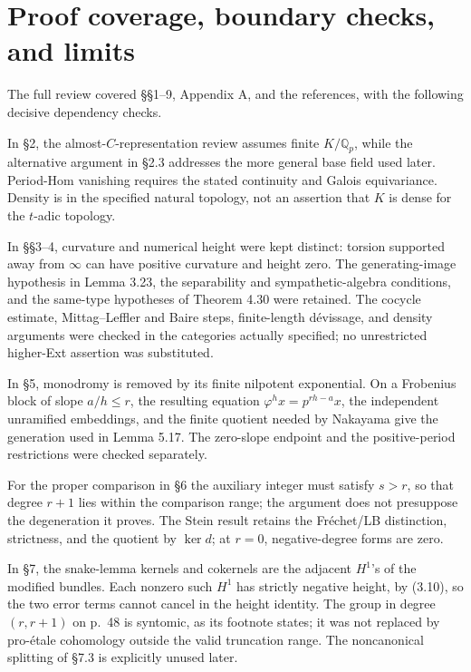 \documentclass[10pt]{article}
\begin{document}
\section*{Proof coverage, boundary checks, and limits}
The full review covered §§1–9, Appendix A, and the references, with the following decisive dependency checks.\par
In §2, the almost-\(C\)-representation review assumes finite \(K/\mathbb Q_p\), while the alternative argument in §2.3 addresses the more general base field used later. Period-Hom vanishing requires the stated continuity and Galois equivariance. Density is in the specified natural topology, not an assertion that \(K\) is dense for the \(t\)-adic topology.\par
In §§3–4, curvature and numerical height were kept distinct: torsion supported away from \(\infty\) can have positive curvature and height zero. The generating-image hypothesis in Lemma 3.23, the separability and sympathetic-algebra conditions, and the same-type hypotheses of Theorem 4.30 were retained. The cocycle estimate, Mittag–Leffler and Baire steps, finite-length dévissage, and density arguments were checked in the categories actually specified; no unrestricted higher-Ext assertion was substituted.\par
In §5, monodromy is removed by its finite nilpotent exponential. On a Frobenius block of slope \(a/h\leq r\), the resulting equation \(\varphi^h x=p^{rh-a}x\), the independent unramified embeddings, and the finite quotient needed by Nakayama give the generation used in Lemma 5.17. The zero-slope endpoint and the positive-period restrictions were checked separately.\par
For the proper comparison in §6 the auxiliary integer must satisfy \(s>r\), so that degree \(r+1\) lies within the comparison range; the argument does not presuppose the degeneration it proves. The Stein result retains the Fréchet/LB distinction, strictness, and the quotient by \(\ker d\); at \(r=0\), negative-degree forms are zero.\par
In §7, the snake-lemma kernels and cokernels are the adjacent \(H^1\)’s of the modified bundles. Each nonzero such \(H^1\) has strictly negative height, by (3.10), so the two error terms cannot cancel in the height identity. The group in degree \((r,r+1)\) on p. 48 is syntomic, as its footnote states; it was not replaced by pro-étale cohomology outside the valid truncation range. The noncanonical splitting of §7.3 is explicitly unused later.\par
\end{document}
